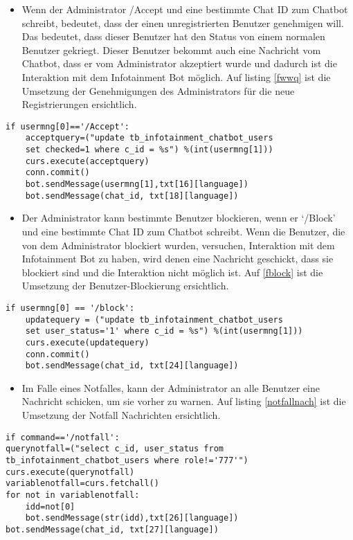 \label{fwe}
\begin{itemize}
	\item Wenn der Administrator /Accept und eine bestimmte Chat ID zum Chatbot schreibt, bedeutet, dass der einen unregistrierten Benutzer genehmigen will. Das bedeutet, dass dieser Benutzer hat den Status von einem normalen Benutzer gekriegt. Dieser Benutzer bekommt auch eine Nachricht vom Chatbot, dass er vom Administrator akzeptiert wurde und dadurch ist die Interaktion mit dem Infotainment Bot m\"oglich. Auf listing \ref{fwwq} ist die Umsetzung der Genehmigungen des Administrators für die neue Registrierungen ersichtlich.
\end{itemize}	
\begin{lstlisting}[frame=single]
if usermng[0]=='/Accept':
	acceptquery=("update tb_infotainment_chatbot_users 
	set checked=1 where c_id = %s") %(int(usermng[1]))
	curs.execute(acceptquery)
	conn.commit()
	bot.sendMessage(usermng[1],txt[16][language])
	bot.sendMessage(chat_id, txt[18][language])
\end{lstlisting}
\label{fwwq}
\begin{itemize}
	\item Der Administrator kann bestimmte Benutzer blockieren, wenn er ‘/Block’ und eine bestimmte Chat ID zum Chatbot schreibt. Wenn die Benutzer, die von dem Administrator blockiert wurden, versuchen, Interaktion mit dem Infotainment Bot zu haben, wird denen eine Nachricht geschickt, dass sie blockiert sind und die Interaktion nicht m\"oglich ist. Auf \ref{fblock} ist die Umsetzung der Benutzer-Blockierung ersichtlich. 
\end{itemize}
\begin{lstlisting}[frame=single]
if usermng[0] == '/block':
	updatequery = ("update tb_infotainment_chatbot_users 
	set user_status='1' where c_id = %s") %(int(usermng[1]))
	curs.execute(updatequery)
	conn.commit()
	bot.sendMessage(chat_id, txt[24][language])
\end{lstlisting}
\label{fblock}
\begin{itemize}
	\item Im Falle eines Notfalles, kann der Administrator an alle Benutzer eine Nachricht schicken, um sie vorher zu warnen. Auf listing \ref{notfallnach} ist die Umsetzung der Notfall Nachrichten ersichtlich.
\end{itemize}
\begin{lstlisting}[frame=single]
if command=='/notfall':
querynotfall=("select c_id, user_status from tb_infotainment_chatbot_users where role!='777'")
curs.execute(querynotfall)
variablenotfall=curs.fetchall()
for not in variablenotfall:
	idd=not[0]
	bot.sendMessage(str(idd),txt[26][language])
bot.sendMessage(chat_id, txt[27][language])
\end{lstlisting}
